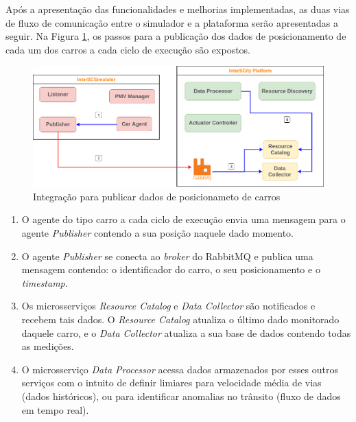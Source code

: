 Após a apresentação das funcionalidades e melhorias implementadas, as duas vias de fluxo de comunicação entre o simulador e a plataforma serão apresentadas a seguir.
Na Figura \ref{fig:smart_traffic_publish_data}, os passos para a publicação dos dados de posicionamento de cada um dos carros a cada ciclo de execução são expostos.

\begin{figure}[ht]
	\centering
	\includegraphics[width=\textwidth]{figuras/integration-publish-car-position.png}
	\caption{Integração para publicar dados de posicionameto de carros}
	\label{fig:smart_traffic_publish_data}
\end{figure}

\begin{enumerate}
    \item O agente do tipo carro a cada ciclo de execução envia uma mensagem para o agente \textit{Publisher} contendo a sua posição naquele dado momento.

    \item O agente \textit{Publisher} se conecta ao \textit{broker} do RabbitMQ e publica uma mensagem contendo: o identificador do carro, o seu posicionamento e o \textit{timestamp}.

    \item Os microsserviços \textit{Resource Catalog} e \textit{Data Collector} são notificados e recebem tais dados. O \textit{Resource Catalog} atualiza o último dado monitorado
        daquele carro, e o \textit{Data Collector} atualiza a sua base de dados contendo todas as medições.

    \item O microsserviço \textit{Data Processor} acessa dados armazenados por esses outros serviços com o intuito de definir limiares para velocidade média de vias (dados históricos),
        ou para identificar anomalias no trânsito (fluxo de dados em tempo real).
\end{enumerate}


